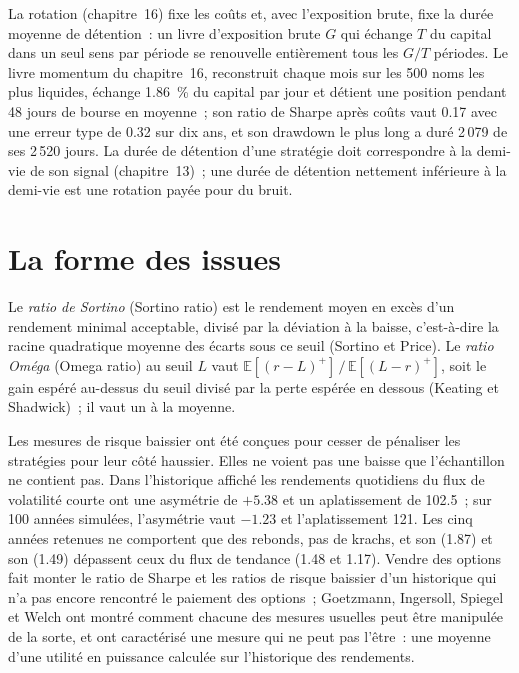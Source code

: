 La rotation (chapitre~16) fixe les coûts et, avec l'exposition brute, fixe la durée moyenne de détention~: un livre d'exposition brute $G$ qui échange $T$ du capital dans un
seul sens par période se renouvelle entièrement tous les $G/T$ périodes. Le livre momentum du chapitre~16, reconstruit chaque mois sur les 500 noms les plus liquides, échange 1.86~\% du capital par jour et
détient une position pendant 48 jours de bourse en moyenne~; son ratio de Sharpe après coûts vaut 0.17 avec une erreur type de 0.32 sur dix ans, et son drawdown le plus long a duré 2\,079 de ses
2\,520 jours. La durée de détention d'une stratégie doit correspondre à la demi-vie de son signal (chapitre~13)~; une durée de détention nettement inférieure à la demi-vie
est une rotation payée pour du bruit.

\section{La forme des issues}

\begin{definition}\label{def:rs:performance-measurement:sortino}
Le \emph{ratio de Sortino} (Sortino ratio) est le rendement moyen en excès d'un rendement minimal acceptable, divisé par la déviation à la baisse, c'est-à-dire la racine quadratique moyenne
des écarts sous ce seuil (Sortino et Price). Le \emph{ratio Oméga} (Omega ratio) au seuil $L$ vaut $\mathbb{E}[(r-L)^+]\,/\,\mathbb{E}[(L-r)^+]$,
soit le gain espéré au-dessus du seuil divisé par la perte espérée en dessous (Keating et Shadwick)~; il vaut un à la moyenne.
\end{definition}

Les mesures de risque baissier ont été conçues pour cesser de pénaliser les stratégies pour leur côté haussier. Elles ne voient pas une baisse que l'échantillon ne contient pas. Dans l'historique affiché
les rendements quotidiens du flux de volatilité courte ont une asymétrie de $+5.38$ et un aplatissement de 102.5~; sur 100 années simulées, l'asymétrie vaut $-1.23$ et l'aplatissement
121. Les cinq années retenues ne comportent que des rebonds, pas de krachs, et son  (1.87) et son  (1.49) dépassent ceux du flux de tendance (1.48 et 1.17). Vendre des options
fait monter le ratio de Sharpe et les ratios de risque baissier d'un historique qui n'a pas encore rencontré le paiement des options~; Goetzmann, Ingersoll, Spiegel et Welch ont montré comment
chacune des mesures usuelles peut être manipulée de la sorte, et ont caractérisé une mesure qui ne peut pas l'être~: une moyenne d'une utilité en puissance calculée sur l'historique des rendements.

